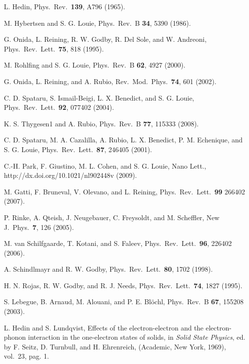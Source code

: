 \documentclass[twocolumn,prb,showpacs,superscriptaddress]{revtex4}
\begin{document}
\begin{thebibliography}{99}

L. Hedin,
Phys.\ Rev.\ {\bf 139}, A796 (1965).

M. Hybertsen and S. G. Louie,
Phys.\ Rev.\ B {\bf 34}, 5390 (1986).

G. Onida, L. Reining, R. W. Godby, R. Del Sole, and W. Andreoni, 
Phys.\ Rev.\ Lett.\ {\bf 75}, 818 (1995).

M. Rohlfing and S. G. Louie,
Phys.\ Rev.\ B {\bf 62}, 4927 (2000).

G. Onida, L. Reining, and A. Rubio,
Rev.\ Mod.\ Phys.\ {\bf 74}, 601 (2002).

C. D. Spataru, S. Ismail-Beigi, L. X. Benedict, and S. G. Louie,
Phys.\ Rev.\ Lett.\ {\bf 92}, 077402 (2004).

K. S. Thygesen1 and A. Rubio,
Phys.\ Rev.\ B {\bf 77}, 115333 (2008).

C. D. Spataru, M. A. Cazalilla, A. Rubio, L. X. Benedict, P. M. Echenique, and S. G. Louie,
Phys.\ Rev.\ Lett.\ {\bf 87}, 246405 (2001).

C.-H. Park, F. Giustino, M. L. Cohen, and S. G. Louie,
Nano Lett., http://dx.doi.org/10.1021/nl902448v (2009).

M. Gatti, F. Bruneval, V. Olevano, and L. Reining,
Phys.\ Rev.\ Lett.\ {\bf 99} 266402 (2007).

P. Rinke, A. Qteish, J. Neugebauer, C. Freysoldt, and M. Scheffler, 
New J.\ Phys.\ {\bf 7}, 126 (2005). 

M. van Schilfgaarde, T. Kotani, and S. Faleev,
Phys.\ Rev.\ Lett.\ {\bf 96}, 226402 (2006).

A. Schindlmayr and R. W. Godby,
Phys.\ Rev.\ Lett.\ {\bf 80}, 1702 (1998).

H. N. Rojas, R. W. Godby, and R. J. Needs,
Phys.\ Rev.\ Lett.\ {\bf 74}, 1827 (1995).

S. Lebegue, B. Arnaud, M. Alouani, and P. E. Bl\"ochl,
Phys.\ Rev.\ B {\bf 67}, 155208 (2003). 

L. Hedin and S. Lundqvist,
Effects of the electron-electron and the electron-phonon interaction in
the one-electron states of solids,
in {\it Solid State Physics}, ed. by F. Seitz, D. Turnbull, and
H. Ehrenreich, (Academic, New York, 1969), vol.\ 23, pag. 1.


\end{thebibliography}
\end{document}
